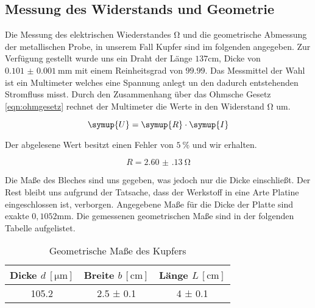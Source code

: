 \subsection{Messung des Widerstands und Geometrie}
\label{sec:aufgabe_a}
Die Messung des elektrischen Wiederstandes $\si{\ohm}$ und die geometrische Abmessung der metallischen Probe, in unserem Fall Kupfer sind im folgenden angegeben.
Zur Verfügung gestellt wurde uns ein Draht der Länge $137\si{\cm}$, Dicke von $\SI{0.101(1)}{\milli\meter}$ mit einem Reinheitsgrad von $99.99$. 
Das Messmittel der Wahl ist ein Multimeter welches eine Spannung anlegt un den dadurch entstehenden Stromfluss misst.
Durch den Zusammenhang über das Ohmsche Gesetz \eqref{eqn:ohmgesetz} rechnet der Multimeter die Werte in den Widerstand $\si{\ohm}$ um.

\begin{equation}
   \symup{U} = \symup{R} \cdot \symup{I}
\end{equation}

Der abgelesene Wert besitzt einen Fehler von $\SI{5}{\percent}$ und wir erhalten.

\begin{equation}
\label{eqn:ohmgesetz}
R = \SI{2.60(13)}{\ohm}
\end{equation}

Die Maße des Bleches sind uns gegeben, was jedoch nur die Dicke einschließt. %
Der Rest bleibt uns aufgrund der Tatsache, dass der Werkstoff in eine Arte Platine eingeschlossen ist, verborgen.
Angegebene Maße für die Dicke der Platte sind exakte $0,1052\si{\mm}$.
Die gemessenen geometrischen Maße sind in der folgenden Tabelle aufgelistet.

\begin{table}
  \centering
  \caption{Geometrische Maße des Kupfers}
  \label{tab:kupfergeo}
  \begin{tabular}{c c c}
    Dicke {$d \: [\si{\micro\meter}]$} & Breite $b \, [\si{\centi\meter}]$ & Länge $L \, [\si{\centi\meter}]$ \\
    \midrule
    105.2   & 2.5 ± 0.1 & 4 ± 0.1 \\
    \bottomrule
  \end{tabular}
\end{table}